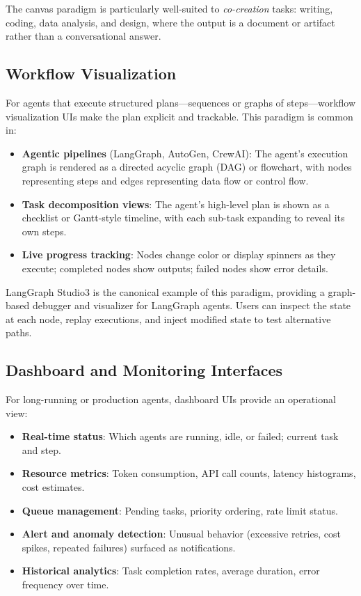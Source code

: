 The canvas paradigm is particularly well-suited to \emph{co-creation} tasks: writing, coding, data analysis, and design, where the output is a document or artifact rather than a conversational answer.

\subsection{Workflow Visualization}
\label{workflow-visualization}

For agents that execute structured plans---sequences or graphs of steps---workflow visualization UIs make the plan explicit and trackable. This paradigm is common in:

\begin{itemize}
  \item \textbf{Agentic pipelines} (LangGraph, AutoGen, CrewAI): The agent’s execution graph is rendered as a directed acyclic graph (DAG) or flowchart, with nodes representing steps and edges representing data flow or control flow.
  \item \textbf{Task decomposition views}: The agent’s high-level plan is shown as a checklist or Gantt-style timeline, with each sub-task expanding to reveal its own steps.
  \item \textbf{Live progress tracking}: Nodes change color or display spinners as they execute; completed nodes show outputs; failed nodes show error details.
\end{itemize}

LangGraph Studio3 is the canonical example of this paradigm, providing a graph-based debugger and visualizer for LangGraph agents. Users can inspect the state at each node, replay executions, and inject modified state to test alternative paths.

\subsection{Dashboard and Monitoring Interfaces}
\label{dashboard-and-monitoring-interfaces}

For long-running or production agents, dashboard UIs provide an operational view:

\begin{itemize}
  \item \textbf{Real-time status}: Which agents are running, idle, or failed; current task and step.
  \item \textbf{Resource metrics}: Token consumption, API call counts, latency histograms, cost estimates.
  \item \textbf{Queue management}: Pending tasks, priority ordering, rate limit status.
  \item \textbf{Alert and anomaly detection}: Unusual behavior (excessive retries, cost spikes, repeated failures) surfaced as notifications.
  \item \textbf{Historical analytics}: Task completion rates, average duration, error frequency over time.
\end{itemize}

